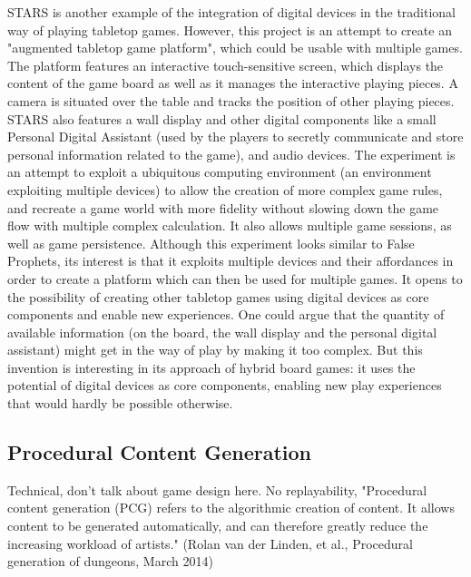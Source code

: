 STARS is another example of the integration of digital devices in the traditional way of playing tabletop games. However, this project is an attempt to create an "augmented tabletop game platform", which could be usable with multiple games. The platform features an interactive touch-sensitive screen, which displays the content of the game board as well as it manages the interactive playing pieces. A camera is situated over the table and tracks the position of other playing pieces. STARS also features a wall display and other digital components like a small Personal Digital Assistant (used by the players to secretly communicate and store personal information related to the game), and audio devices. The experiment is an attempt to exploit a ubiquitous computing environment (an environment exploiting multiple devices) to allow the creation of more complex game rules, and recreate a game world with more fidelity without slowing down the game flow with multiple complex calculation. It also allows multiple game sessions, as well as game persistence. Although this experiment looks similar to False Prophets, its interest is that it exploits multiple devices and their affordances in order to create a platform which can then be used for multiple games. It opens to the possibility of creating other tabletop games using digital devices as core components and enable new experiences. One could argue that the quantity of available information (on the board, the wall display and the personal digital assistant) might get in the way of play by making it too complex. But this invention is interesting in its approach of hybrid board games: it uses the potential of digital devices as core components, enabling new play experiences that would hardly be possible otherwise.
\subsection{Procedural Content Generation}
Technical, don't talk about game design here. No replayability, 
"Procedural content generation (PCG) refers to the algorithmic creation of content. It allows content to be generated automatically, and can therefore greatly reduce the increasing workload of artists." (Rolan van der Linden, et al., Procedural generation of dungeons, March 2014)

